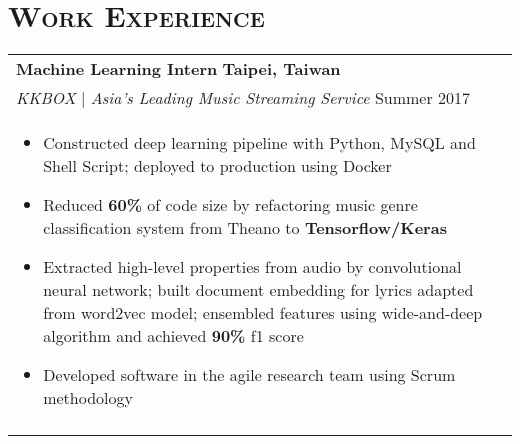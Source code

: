 \documentclass[letterpaper,11pt]{article} %
\begin{document}
{%
\section{\Large\bf\textsc{Work Experience}}
\begin{tabular}{p{18.5cm}}

{\bf{Machine Learning Intern}} \hfill \bf{Taipei, Taiwan}\\
{\it KKBOX} | {\it Asia's Leading Music Streaming Service } \hfill  Summer 2017\\%
\begin{itemize}
\vspace{-3mm}
\item Constructed deep learning pipeline with Python, MySQL and Shell Script; deployed to production using Docker
\item Reduced {\bf 60\%} of code size by refactoring music genre classification system from Theano to {\bf Tensorflow/Keras} 
\item Extracted high-level properties from audio by convolutional neural network; built document embedding for lyrics adapted from word2vec model; ensembled features using wide-and-deep algorithm and achieved {\bf 90\%} f1 score 
\item Developed software in the agile research team using Scrum methodology \vspace*{-\baselineskip}
\end{itemize} \\ 
\vspace{.1mm}


\end{tabular}}
\end{document}
